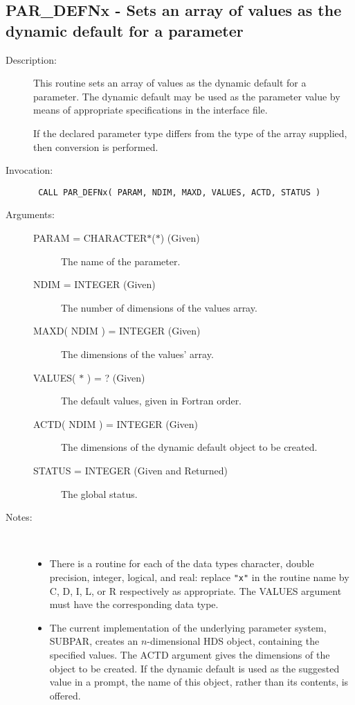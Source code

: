 \documentclass[twoside,11pt]{article}
\newcommand{\xlabel}[1]{}
\newlength{\sstbannerlength}
\newlength{\sstcaptionlength}
\newlength{\sstexampleslength}
\newlength{\sstexampleswidth}
\newcommand{\sstroutine}[3]{
   \goodbreak
   \rule{\textwidth}{0.5mm}
   \vspace{-7ex}
   \newline
   \settowidth{\sstbannerlength}{{\Large {\bf #1}}}
   \setlength{\sstcaptionlength}{\textwidth}
   \setlength{\sstexampleslength}{\textwidth}
   \addtolength{\sstbannerlength}{0.5em}
   \addtolength{\sstcaptionlength}{-2.0\sstbannerlength}
   \addtolength{\sstcaptionlength}{-5.0pt}
   \settowidth{\sstexampleswidth}{{\bf Examples:}}
   \addtolength{\sstexampleslength}{-\sstexampleswidth}
   \parbox[t]{\sstbannerlength}{\flushleft{\Large {\bf #1}}}
   \parbox[t]{\sstcaptionlength}{\center{\Large #2}}
   \parbox[t]{\sstbannerlength}{\flushright{\Large {\bf #1}}}
   \begin{description}
      #3
   \end{description}
}
\newcommand{\sstdescription}[1]{\item[Description:] #1}
\newcommand{\sstinvocation}[1]{\item[Invocation:]\hspace{0.4em}{\tt #1}}
\newcommand{\sstarguments}[1]{
   \item[Arguments:] \mbox{} \\
   \vspace{-3.5ex}
   \begin{description}
      #1
   \end{description}
}
\newcommand{\sstsubsection}[1]{ \item[{#1}] \mbox{} \\}
\newcommand{\sstnotes}[1]{\item[Notes:] \mbox{} \\[1.3ex] #1}
\newcommand{\sstitemlist}[1]{
  \mbox{} \\
  \vspace{-7ex}
  \begin{itemize}
     #1
  \end{itemize}
}
\newcommand{\sstitem}{\item}
\newcommand{\ssttt}{\tt}
\renewcommand{\sstroutine}[3]{
      \subsection{\xlabel{12}#1\xlabel{#1}-\label{#1}#2}
      \begin{description}
         #3
      \end{description}
   }
\renewcommand{\sstdescription}[1]{\item[Description:]
      \begin{description}
         #1
      \end{description}
   }
\renewcommand{\sstinvocation}[1]{\item[Invocation:]
      \begin{description}
         {\ssttt #1}
      \end{description}
   }
\renewcommand{\sstarguments}[1]{
      \item[Arguments:]
      \begin{description}
         #1
      \end{description}
   }
\renewcommand{\sstsubsection}[1]{\item[{#1}]}
\renewcommand{\sstnotes}[1]{\item[Notes:]
      \begin{description}
         #1
      \end{description}
   }
\newcommand{\sstitemlist}[1]{
      \begin{itemize}
         #1
      \end{itemize}
   }
\begin{document}
\sstroutine{
   PAR\_DEFNx
}{
   Sets an array of values as the dynamic default for a parameter
}{
   \sstdescription{
      This routine sets an array of values as the dynamic default for
      a parameter. The dynamic default may be used as the parameter
      value by means of appropriate specifications in the interface
      file.

      If the declared parameter type differs from the type of the
      array supplied, then conversion is performed.
   }
   \sstinvocation{
      CALL PAR\_DEFNx( PARAM, NDIM, MAXD, VALUES, ACTD, STATUS )
   }
   \sstarguments{
      \sstsubsection{
         PARAM = CHARACTER$*$($*$) (Given)
      }{
         The name of the parameter.
      }
      \sstsubsection{
         NDIM = INTEGER (Given)
      }{
         The number of dimensions of the values array.
      }
      \sstsubsection{
         MAXD( NDIM ) = INTEGER (Given)
      }{
         The dimensions of the values' array.
      }
      \sstsubsection{
         VALUES( $*$ ) = ? (Given)
      }{
         The default values, given in Fortran order.
      }
      \sstsubsection{
         ACTD( NDIM ) = INTEGER (Given)
      }{
         The dimensions of the dynamic default object to be created.
      }
      \sstsubsection{
         STATUS = INTEGER (Given and Returned)
      }{
         The global status.
      }
   }
   \sstnotes{
      \sstitemlist{

         \sstitem
         There is a routine for each of the data types character,
         double precision, integer, logical, and real: replace {\tt "x"} in the
         routine name by C, D, I, L, or R respectively as appropriate.  The
         VALUES argument must have the corresponding data type.

         \sstitem
         The current implementation of the underlying parameter system,
         SUBPAR, creates an $n$-dimensional HDS object, containing the
         specified values. The ACTD argument gives the dimensions of
         the object to be created.  If the dynamic default is used as the
         suggested value in a prompt, the name of this object, rather than
         its contents, is offered.
      }
   }
}
\end{document}
